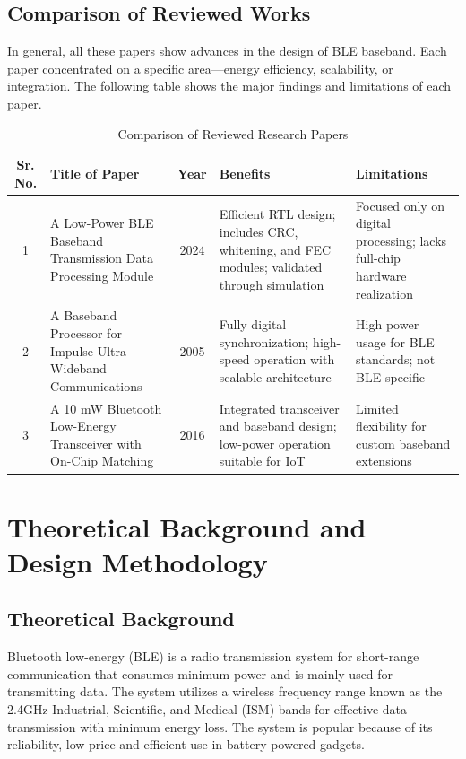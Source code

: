 \documentclass[12pt,singleside,a4paper]{report}
\begin{document}
\section{Comparison of Reviewed Works}
In general, all these papers show advances in the design of BLE baseband. Each paper concentrated on a specific area—energy efficiency, scalability, or integration. The following table shows the major findings and limitations of each paper.

\begin{table}[H]
\centering
\caption{Comparison of Reviewed Research Papers}
\label{tab:comparison}
\begin{tabular}{|c|p{4cm}|c|p{4cm}|p{4cm}|}
\hline
\textbf{Sr. No.} & \textbf{Title of Paper} & \textbf{Year} & \textbf{Benefits} & \textbf{Limitations} \\ \hline
1 & A Low-Power BLE Baseband Transmission Data Processing Module & 2024 & Efficient RTL design; includes CRC, whitening, and FEC modules; validated through simulation & Focused only on digital processing; lacks full-chip hardware realization \\ \hline
2 & A Baseband Processor for Impulse Ultra-Wideband Communications & 2005 & Fully digital synchronization; high-speed operation with scalable architecture & High power usage for BLE standards; not BLE-specific \\ \hline
3 & A 10 mW Bluetooth Low-Energy Transceiver with On-Chip Matching & 2016 & Integrated transceiver and baseband design; low-power operation suitable for IoT & Limited flexibility for custom baseband extensions \\ \hline
\end{tabular}
\end{table}





\chapter{Theoretical Background and Design Methodology}

\section{Theoretical Background}
Bluetooth low-energy (BLE) is a radio transmission system for short-range communication that consumes minimum power and is mainly used for transmitting data. The system utilizes a wireless frequency range known as the 2.4GHz Industrial, Scientific, and Medical (ISM) bands for effective data transmission with minimum energy loss. The system is popular because of its reliability, low price and efficient use in battery-powered gadgets.
\end{document}
